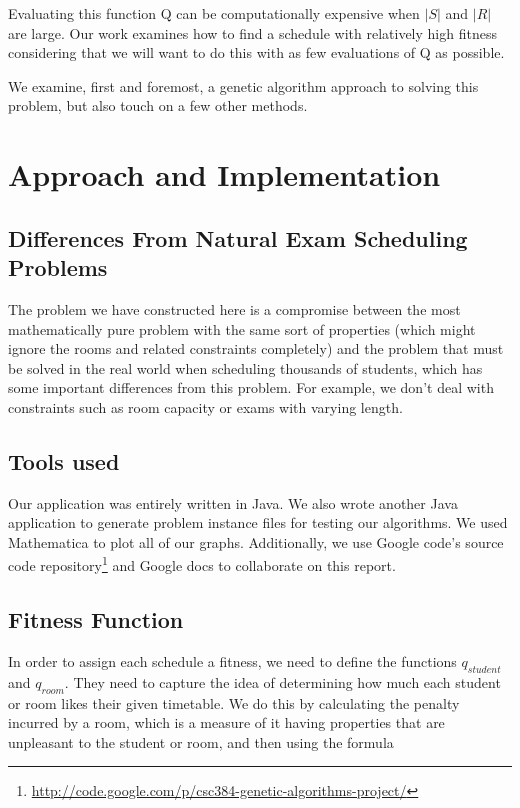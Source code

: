 \documentclass[letterpaper]{article}
\begin{document}
  Evaluating this function Q can be computationally expensive when $|S|$ and $|R|$
  are large. Our work examines how to find a schedule with relatively high fitness
  considering that we will want to do this with as few evaluations of Q as possible.

  We examine, first and foremost, a genetic algorithm approach to solving this problem,
  but also touch on a few other methods.

\section{Approach and Implementation}
  \subsection{Differences From Natural Exam Scheduling Problems}
    The problem we have constructed here is a compromise between the most
    mathematically pure problem with the same sort of properties (which might ignore the
    rooms and related constraints completely) and the problem that must be solved in the
    real world when scheduling thousands of students, which has some important differences
    from this problem. For example, we don't deal with constraints such as room capacity
    or exams with varying length.
    
  \subsection{Tools used}
    Our application was entirely written in Java. We also wrote another Java application 
    to generate problem instance files for testing our algorithms. We used Mathematica 
    to plot all of our graphs.  Additionally, we use Google code's source code
    repository\footnote{\url{http://code.google.com/p/csc384-genetic-algorithms-project/}} 
    and Google docs to collaborate on this report.
    
  \subsection{Fitness Function}
    In order to assign each schedule a fitness, we need to define the functions 
    $q_{student}$ and $q_{room}$. They need to capture the idea of determining how
    much each student or room likes their given timetable. We do this by calculating 
    the penalty incurred by a room, which is a measure of it having properties that 
    are unpleasant to the student or room, and then using the formula
    
\end{document}

